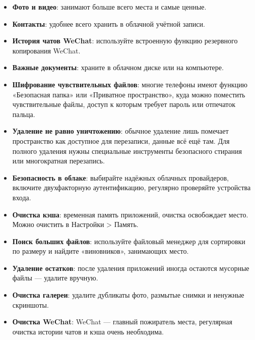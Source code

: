 
\begin{itemize}
  \item \textbf{Фото и видео}: занимают больше всего места и самые ценные.
  \item \textbf{Контакты}: удобнее всего хранить в облачной учётной записи.
  \item \textbf{История чатов WeChat}: используйте встроенную функцию резервного копирования WeChat.
  \item \textbf{Важные документы}: храните в облачном диске или на компьютере.
\end{itemize}


\begin{itemize}
  \item \textbf{Шифрование чувствительных файлов}: многие телефоны имеют функцию «Безопасная папка» или «Приватное пространство», куда можно поместить чувствительные файлы, доступ к которым требует пароль или отпечаток пальца.
  \item \textbf{Удаление не равно уничтожению}: обычное удаление лишь помечает пространство как доступное для перезаписи, данные всё ещё там. Для полного удаления нужны специальные инструменты безопасного стирания или многократная перезапись.
  \item \textbf{Безопасность в облаке}: выбирайте надёжных облачных провайдеров, включите двухфакторную аутентификацию, регулярно проверяйте устройства входа.
\end{itemize}


\begin{itemize}
  \item \textbf{Очистка кэша}: временная память приложений, очистка освобождает место. Можно очистить в Настройки > Память.
  \item \textbf{Поиск больших файлов}: используйте файловый менеджер для сортировки по размеру и найдите «виновников», занимающих место.
  \item \textbf{Удаление остатков}: после удаления приложений иногда остаются мусорные файлы — удалите вручную.
  \item \textbf{Очистка галереи}: удалите дубликаты фото, размытые снимки и ненужные скриншоты.
  \item \textbf{Очистка WeChat}: WeChat — главный пожиратель места, регулярная очистка истории чатов и кэша очень необходима.
\end{itemize}

